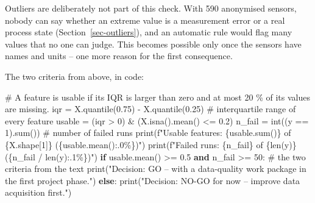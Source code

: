 \documentclass[
  letterpaper,
  DIV=11,
  numbers=noendperiod]{scrreprt}
\newenvironment{Shaded}{\begin{snugshade}}{\end{snugshade}}
\newcommand{\BuiltInTok}[1]{\textcolor[rgb]{0.00,0.23,0.31}{#1}}
\newcommand{\CommentTok}[1]{\textcolor[rgb]{0.37,0.37,0.37}{#1}}
\newcommand{\ControlFlowTok}[1]{\textcolor[rgb]{0.00,0.23,0.31}{\textbf{#1}}}
\newcommand{\DecValTok}[1]{\textcolor[rgb]{0.68,0.00,0.00}{#1}}
\newcommand{\FloatTok}[1]{\textcolor[rgb]{0.68,0.00,0.00}{#1}}
\newcommand{\KeywordTok}[1]{\textcolor[rgb]{0.00,0.23,0.31}{\textbf{#1}}}
\newcommand{\NormalTok}[1]{\textcolor[rgb]{0.00,0.23,0.31}{#1}}
\newcommand{\OperatorTok}[1]{\textcolor[rgb]{0.37,0.37,0.37}{#1}}
\newcommand{\SpecialCharTok}[1]{\textcolor[rgb]{0.37,0.37,0.37}{#1}}
\newcommand{\SpecialStringTok}[1]{\textcolor[rgb]{0.13,0.47,0.30}{#1}}
\newcommand{\StringTok}[1]{\textcolor[rgb]{0.13,0.47,0.30}{#1}}
\begin{document}
Outliers are deliberately not part of this check. With 590 anonymised
sensors, nobody can say whether an extreme value is a measurement error
or a real process state (Section~\ref{sec-outliers}), and an automatic
rule would flag many values that no one can judge. This becomes possible
only once the sensors have names and units -- one more reason for the
first consequence.

The two criteria from above, in code:

\begin{Shaded}
\begin{Highlighting}[]
\CommentTok{\# A feature is usable if its IQR is larger than zero and at most 20 \% of its values are missing.}
\NormalTok{iqr }\OperatorTok{=}\NormalTok{ X.quantile(}\FloatTok{0.75}\NormalTok{) }\OperatorTok{{-}}\NormalTok{ X.quantile(}\FloatTok{0.25}\NormalTok{)          }\CommentTok{\# interquartile range of every feature}
\NormalTok{usable }\OperatorTok{=}\NormalTok{ (iqr }\OperatorTok{\textgreater{}} \DecValTok{0}\NormalTok{) }\OperatorTok{\&}\NormalTok{ (X.isna().mean() }\OperatorTok{\textless{}=} \FloatTok{0.2}\NormalTok{)}
\NormalTok{n\_fail }\OperatorTok{=} \BuiltInTok{int}\NormalTok{((y }\OperatorTok{==} \DecValTok{1}\NormalTok{).}\BuiltInTok{sum}\NormalTok{())                       }\CommentTok{\# number of failed runs}
\BuiltInTok{print}\NormalTok{(}\SpecialStringTok{f"Usable features: }\SpecialCharTok{\{}\NormalTok{usable}\SpecialCharTok{.}\BuiltInTok{sum}\NormalTok{()}\SpecialCharTok{\}}\SpecialStringTok{ of }\SpecialCharTok{\{}\NormalTok{X}\SpecialCharTok{.}\NormalTok{shape[}\DecValTok{1}\NormalTok{]}\SpecialCharTok{\}}\SpecialStringTok{ (}\SpecialCharTok{\{}\NormalTok{usable}\SpecialCharTok{.}\NormalTok{mean()}\SpecialCharTok{:.0\%\}}\SpecialStringTok{)"}\NormalTok{)}
\BuiltInTok{print}\NormalTok{(}\SpecialStringTok{f"Failed runs: }\SpecialCharTok{\{}\NormalTok{n\_fail}\SpecialCharTok{\}}\SpecialStringTok{ of }\SpecialCharTok{\{}\BuiltInTok{len}\NormalTok{(y)}\SpecialCharTok{\}}\SpecialStringTok{ (}\SpecialCharTok{\{}\NormalTok{n\_fail }\OperatorTok{/} \BuiltInTok{len}\NormalTok{(y)}\SpecialCharTok{:.1\%\}}\SpecialStringTok{)"}\NormalTok{)}
\ControlFlowTok{if}\NormalTok{ usable.mean() }\OperatorTok{\textgreater{}=} \FloatTok{0.5} \KeywordTok{and}\NormalTok{ n\_fail }\OperatorTok{\textgreater{}=} \DecValTok{50}\NormalTok{:          }\CommentTok{\# the two criteria from the text}
    \BuiltInTok{print}\NormalTok{(}\StringTok{"Decision: GO – with a data{-}quality work package in the first project phase."}\NormalTok{)}
\ControlFlowTok{else}\NormalTok{:}
    \BuiltInTok{print}\NormalTok{(}\StringTok{"Decision: NO{-}GO for now – improve data acquisition first."}\NormalTok{)}
\end{Highlighting}
\end{Shaded}
\end{document}
